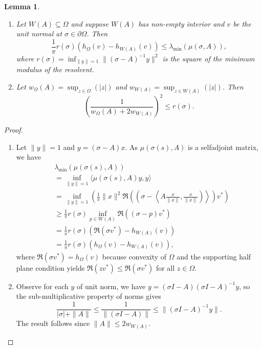 \documentclass{article}
\newtheorem{Lemma}[Theorem]{Lemma}
\begin{document}
\begin{Lemma}\label{3.1}
\begin{enumerate}
    \item Let $ W(A) \subseteq \Omega$ and suppose $W(A)$ has non-empty interior and $v$ be the unit normal at $\sigma \in \partial \Omega$. Then 
\begin{equation}\label{lambdaminforqnumrange}
      \frac{1}{\pi} r(\sigma) \left( h_{\Omega}(v) - h_{W(A)}(v) \right) \leq \lambda_{\min} ( \mu ( \sigma  , A )),
\end{equation}
where $r(\sigma) = \inf_{\|y\|=1}\|(\sigma - A)^{-1}y\|^2$ is the square of the minimum modulus of the resolvent.
\item     Let $w_{\Omega}(A)= \sup_{z \in \Omega}(|z|)$ and $w_{W(A)} = \sup_{z \in W(A)}(|z|)$. Then 
    $$
    \left(\frac{1}{w_{\Omega}(A) + 2w_{W(A)}}\right)^2 \leq r(\sigma).
    $$
\end{enumerate}    
\end{Lemma}
\begin{proof}
\begin{enumerate}
    \item Let $\|y\| =1 $ and $y = (\sigma - A)x$. As $ \mu ( \sigma (s) , A )$ is a selfadjoint matrix, we have
    \begin{align}
        &\lambda_{\min} ( \mu ( \sigma (s) , A )) \\
        &= \inf_{\|y\|=1}\langle\mu ( \sigma (s) , A )y,y \rangle \\
        & =\inf_{\|y\| = 1} \left( \frac{1}{\pi} \|x\|^2\Re\left(\left(\sigma - \left\langle A \frac{x}{\|x\|}, \frac{x}{\|x\|} \right)\right\rangle\right)v^*\right) \\
        & \geq \frac{1}{\pi} r(\sigma) \inf_{p \in W(A)} \Re ((\sigma - p)v^*) \\
        &= \frac{1}{\pi} r(\sigma) \left( \Re(\sigma v^*) - h_{W(A)}(v) \right) \\
        &=\frac{1}{\pi} r(\sigma) \left( h_{\Omega}(v) - h_{W(A)}(v) \right),
    \end{align}
    where $\Re(\sigma v^*) =  h_{\Omega}(v) $ because convexity of $\Omega$ and the supporting half plane condition yields $\Re (zv^*) \leq \Re(\sigma v^*)$ for all $z \in \Omega$.
    \item Observe for each $y$ of unit norm, we have $y = (\sigma I - A)(\sigma I - A)^{-1}y$, so the sub-multiplicative property of norms gives
        $$
        \frac{1}{|\sigma| + \|A\|}\leq \frac{1}{\|(\sigma I - A)\|} \leq \| (\sigma I - A)^{-1}y\|.
        $$
        The result follows since $\|A\| \leq 2w_{W(A)} $.
\end{enumerate}    
\end{proof}
\end{document}
